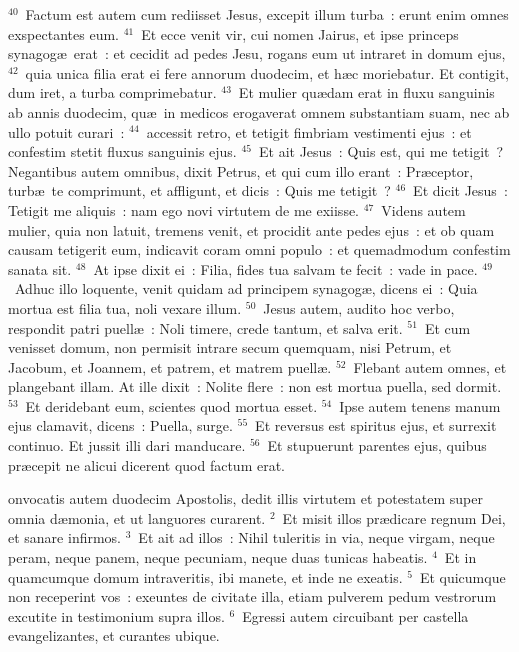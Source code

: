 ${}^{40}$~Factum est autem cum rediisset Jesus, excepit illum turba~: erunt enim omnes exspectantes eum.
${}^{41}$~Et ecce venit vir, cui nomen Jairus, et ipse princeps synagog\ae\ erat~: et cecidit ad pedes Jesu, rogans eum ut intraret in domum ejus,
${}^{42}$~quia unica filia erat ei fere annorum duodecim, et h\ae c moriebatur. Et contigit, dum iret, a turba comprimebatur.
${}^{43}$~Et mulier qu\ae dam erat in fluxu sanguinis ab annis duodecim, qu\ae\ in medicos erogaverat omnem substantiam suam, nec ab ullo potuit curari~:
${}^{44}$~accessit retro, et tetigit fimbriam vestimenti ejus~: et confestim stetit fluxus sanguinis ejus.
${}^{45}$~Et ait Jesus~: Quis est, qui me tetigit~? Negantibus autem omnibus, dixit Petrus, et qui cum illo erant~: Pr\ae ceptor, turb\ae\ te comprimunt, et affligunt, et dicis~: Quis me tetigit~?
${}^{46}$~Et dicit Jesus~: Tetigit me aliquis~: nam ego novi virtutem de me exiisse.
${}^{47}$~Videns autem mulier, quia non latuit, tremens venit, et procidit ante pedes ejus~: et ob quam causam tetigerit eum, indicavit coram omni populo~: et quemadmodum confestim sanata sit.
${}^{48}$~At ipse dixit ei~: Filia, fides tua salvam te fecit~: vade in pace.
${}^{49}$~Adhuc illo loquente, venit quidam ad principem synagog\ae , dicens ei~: Quia mortua est filia tua, noli vexare illum.
${}^{50}$~Jesus autem, audito hoc verbo, respondit patri puell\ae~: Noli timere, crede tantum, et salva erit.
${}^{51}$~Et cum venisset domum, non permisit intrare secum quemquam, nisi Petrum, et Jacobum, et Joannem, et patrem, et matrem puell\ae .
${}^{52}$~Flebant autem omnes, et plangebant illam. At ille dixit~: Nolite flere~: non est mortua puella, sed dormit.
${}^{53}$~Et deridebant eum, scientes quod mortua esset.
${}^{54}$~Ipse autem tenens manum ejus clamavit, dicens~: Puella, surge.
${}^{55}$~Et reversus est spiritus ejus, et surrexit continuo. Et jussit illi dari manducare.
${}^{56}$~Et stupuerunt parentes ejus, quibus pr\ae cepit ne alicui dicerent quod factum erat.

\bchapter
{}onvocatis autem duodecim Apostolis, dedit illis virtutem et potestatem super omnia d\ae monia, et ut languores curarent.
${}^{2}$~Et misit illos pr\ae dicare regnum Dei, et sanare infirmos.
${}^{3}$~Et ait ad illos~: Nihil tuleritis in via, neque virgam, neque peram, neque panem, neque pecuniam, neque duas tunicas habeatis.
${}^{4}$~Et in quamcumque domum intraveritis, ibi manete, et inde ne exeatis.
${}^{5}$~Et quicumque non receperint vos~: exeuntes de civitate illa, etiam pulverem pedum vestrorum excutite in testimonium supra illos.
${}^{6}$~Egressi autem circuibant per castella evangelizantes, et curantes ubique.


